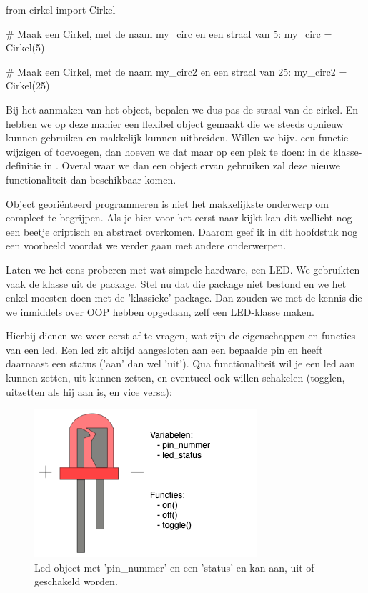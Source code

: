 \begin{python}
from cirkel import Cirkel

# Maak een Cirkel, met de naam my_circ en een straal van 5:
my_circ  = Cirkel(5)   

# Maak een Cirkel, met de naam my_circ2 en een straal van 25:
my_circ2 = Cirkel(25) 
\end{python}

Bij het aanmaken van het object, bepalen we dus pas de straal van de cirkel. En hebben we op deze manier een flexibel object gemaakt die we steeds opnieuw kunnen gebruiken en makkelijk kunnen uitbreiden. Willen we bijv. een functie wijzigen of toevoegen, dan hoeven we dat maar op een plek te doen: in de klasse-definitie in . Overal waar we dan een object ervan gebruiken zal deze nieuwe functionaliteit dan beschikbaar komen. 

\newpage

Object georiënteerd programmeren is niet het makkelijkste onderwerp om compleet te begrijpen. Als je hier voor het eerst naar kijkt kan dit wellicht nog een beetje criptisch en abstract overkomen. Daarom geef ik in dit hoofdstuk nog een voorbeeld voordat we verder gaan met andere onderwerpen. 

Laten we het eens proberen met wat simpele hardware, een LED. We gebruikten vaak de  klasse uit de  package. Stel nu dat die package niet bestond en we het enkel moesten doen met de 'klassieke'  package. Dan zouden we met de kennis die we inmiddels over OOP hebben opgedaan, zelf een LED-klasse maken. 

Hierbij dienen we weer eerst af te vragen, wat zijn de eigenschappen en functies van een led. Een led zit altijd aangesloten aan een bepaalde pin en heeft daarnaast een status ('aan' dan wel 'uit'). Qua functionaliteit wil je een led aan kunnen zetten, uit kunnen zetten, en eventueel ook willen schakelen (togglen, uitzetten als hij aan is, en vice versa): 

\begin{figure}[!ht]
\centering\includegraphics[scale=0.5]{Pictures/chapter07/led.png}
\caption{Led-object met 'pin\_nummer' en een 'status' en kan aan, uit of geschakeld worden.}
\label{fig:led} %
\end{figure}


